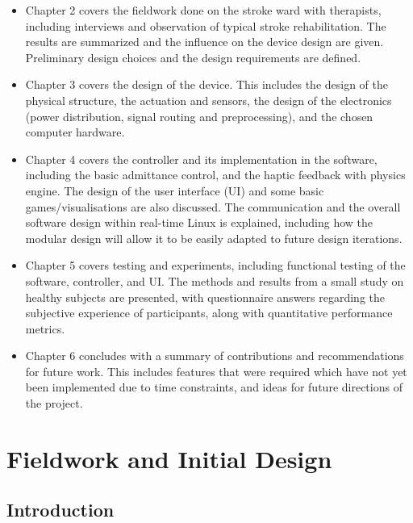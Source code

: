 \documentclass[12pt]{report}
\begin{document}
\begin{itemize}

\item Chapter 2 covers the fieldwork done on the stroke ward with therapists, including interviews and observation of typical stroke rehabilitation. The results are summarized and the influence on the device design are given. Preliminary design choices and the design requirements are defined.

\item Chapter 3 covers the design of the device. This includes the design of the physical structure, the actuation and sensors, the design of the electronics (power distribution, signal routing and preprocessing), and the chosen computer hardware. 

\item Chapter 4 covers the controller and its implementation in the software, including the basic admittance control, and the haptic feedback with physics engine. The design of the user interface (UI) and some basic games/visualisations are also discussed. The communication and the overall software design within real-time Linux is explained, including how the modular design will allow it to be easily adapted to future design iterations. 

\item Chapter 5 covers testing and experiments, including functional testing of the software, controller, and UI. The methods and results from a small study on healthy subjects are presented, with questionnaire answers regarding the subjective experience of participants, along with quantitative performance metrics. 

\item Chapter 6 concludes with a summary of contributions and recommendations for future work. This includes features that were required which have not yet been implemented due to time constraints, and ideas for future directions of the project. 


\end{itemize}

\chapter{Fieldwork and Initial Design} 

\section{Introduction}
\end{document}
